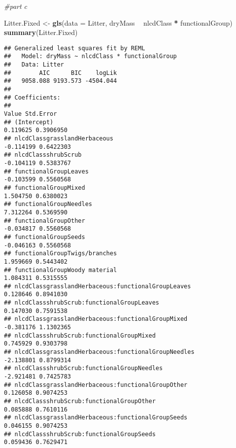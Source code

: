 \documentclass[]{article}
\newenvironment{Shaded}{\begin{snugshade}}{\end{snugshade}}
\newcommand{\CommentTok}[1]{\textcolor[rgb]{0.56,0.35,0.01}{\textit{#1}}}
\newcommand{\DataTypeTok}[1]{\textcolor[rgb]{0.13,0.29,0.53}{#1}}
\newcommand{\KeywordTok}[1]{\textcolor[rgb]{0.13,0.29,0.53}{\textbf{#1}}}
\newcommand{\NormalTok}[1]{#1}
\newcommand{\OperatorTok}[1]{\textcolor[rgb]{0.81,0.36,0.00}{\textbf{#1}}}
\newcommand{\StringTok}[1]{\textcolor[rgb]{0.31,0.60,0.02}{#1}}
\begin{document}
\begin{Shaded}
\begin{Highlighting}[]
\CommentTok{#part c}

\NormalTok{Litter.Fixed <-}\StringTok{ }\KeywordTok{gls}\NormalTok{(}\DataTypeTok{data =}\NormalTok{ Litter,}
\NormalTok{                    dryMass }\OperatorTok{~}\StringTok{ }\NormalTok{nlcdClass }\OperatorTok{*}\StringTok{ }\NormalTok{functionalGroup)}
\KeywordTok{summary}\NormalTok{(Litter.Fixed)}
\end{Highlighting}
\end{Shaded}

\begin{verbatim}
## Generalized least squares fit by REML
##   Model: dryMass ~ nlcdClass * functionalGroup 
##   Data: Litter 
##        AIC      BIC    logLik
##   9058.088 9193.573 -4504.044
## 
## Coefficients:
##                                                                Value Std.Error
## (Intercept)                                                 0.119625 0.3906950
## nlcdClassgrasslandHerbaceous                               -0.114199 0.6422303
## nlcdClassshrubScrub                                        -0.104119 0.5383767
## functionalGroupLeaves                                      -0.103599 0.5560568
## functionalGroupMixed                                        1.504750 0.6380023
## functionalGroupNeedles                                      7.312264 0.5369590
## functionalGroupOther                                       -0.034817 0.5560568
## functionalGroupSeeds                                       -0.046163 0.5560568
## functionalGroupTwigs/branches                               1.959669 0.5443402
## functionalGroupWoody material                               1.084311 0.5315555
## nlcdClassgrasslandHerbaceous:functionalGroupLeaves          0.128646 0.8941030
## nlcdClassshrubScrub:functionalGroupLeaves                   0.147030 0.7591538
## nlcdClassgrasslandHerbaceous:functionalGroupMixed          -0.381176 1.1302365
## nlcdClassshrubScrub:functionalGroupMixed                    0.745929 0.9303798
## nlcdClassgrasslandHerbaceous:functionalGroupNeedles        -2.138801 0.8799314
## nlcdClassshrubScrub:functionalGroupNeedles                 -2.921481 0.7425783
## nlcdClassgrasslandHerbaceous:functionalGroupOther           0.126058 0.9074253
## nlcdClassshrubScrub:functionalGroupOther                    0.085888 0.7610116
## nlcdClassgrasslandHerbaceous:functionalGroupSeeds           0.046155 0.9074253
## nlcdClassshrubScrub:functionalGroupSeeds                    0.059436 0.7629471

\end{verbatim}
\end{document}
